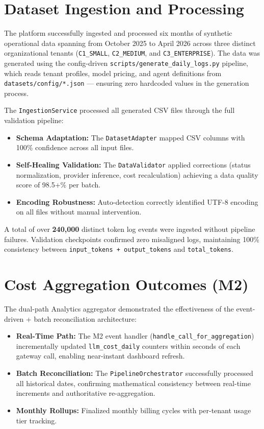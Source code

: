 \documentclass[12pt,a4paper,twoside]{report}
\begin{document}
\section{Dataset Ingestion and Processing}

The platform successfully ingested and processed six months of synthetic operational data spanning from October 2025 to April 2026 across three distinct organizational tenants (\texttt{C1\_SMALL}, \texttt{C2\_MEDIUM}, and \texttt{C3\_ENTERPRISE}). The data was generated using the config-driven \texttt{scripts/generate\_daily\_logs.py} pipeline, which reads tenant profiles, model pricing, and agent definitions from \texttt{datasets/config/*.json} --- ensuring zero hardcoded values in the generation process.

The \texttt{IngestionService} processed all generated CSV files through the full validation pipeline:
\begin{itemize}
  \item \textbf{Schema Adaptation:} The \texttt{DatasetAdapter} mapped CSV columns with 100\% confidence across all input files.
  \item \textbf{Self-Healing Validation:} The \texttt{DataValidator} applied corrections (status normalization, provider inference, cost recalculation) achieving a data quality score of 98.5+\% per batch.
  \item \textbf{Encoding Robustness:} Auto-detection correctly identified UTF-8 encoding on all files without manual intervention.
\end{itemize}

A total of over \textbf{240,000} distinct token log events were ingested without pipeline failures. Validation checkpoints confirmed zero misaligned logs, maintaining 100\% consistency between \texttt{input\_tokens + output\_tokens} and \texttt{total\_tokens}.

\section{Cost Aggregation Outcomes (M2)}

The dual-path Analytics aggregator demonstrated the effectiveness of the event-driven + batch reconciliation architecture:
\begin{itemize}
    \item \textbf{Real-Time Path:} The M2 event handler (\texttt{handle\_call\_for\_aggregation}) incrementally updated \texttt{llm\_cost\_daily} counters within seconds of each gateway call, enabling near-instant dashboard refresh.
    \item \textbf{Batch Reconciliation:} The \texttt{PipelineOrchestrator} successfully processed all historical dates, confirming mathematical consistency between real-time increments and authoritative re-aggregation.
    \item \textbf{Monthly Rollups:} Finalized monthly billing cycles with per-tenant usage tier tracking.
\end{itemize}
\end{document}

